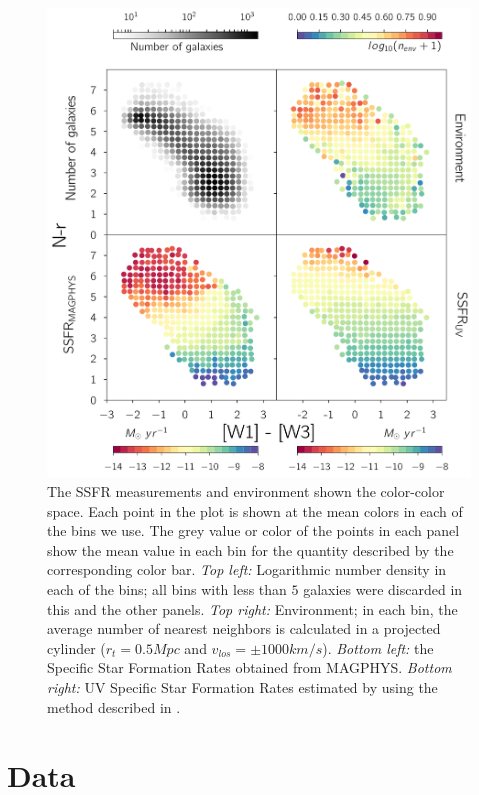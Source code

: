 \documentclass[iop]{emulateapj}
\begin{document}
\begin{figure}
    \centering
	\includegraphics[width = 16 cm, height = 16 cm]{1_panel_plot.pdf}
	\caption{The SSFR measurements and environment shown the color-color 
    space. Each point in the plot is shown at the mean colors in each of 
    the bins we use. The grey value or color of the points in each
    panel show the mean value in each bin for the quantity described 
    by the corresponding  color bar.
    \emph{Top left:} Logarithmic number density in each of the 
    bins; all bins with less than $5$ galaxies were discarded in this 
    and the other panels. \emph{Top right:} Environment; in each bin, 
    the average number of nearest neighbors is calculated in a 
    projected cylinder ($r_{t} = 0.5 Mpc$ and $v_{los} = \pm 1000 km/s$). 
    \emph{Bottom left:} the Specific Star Formation Rates obtained from 
    MAGPHYS. \emph{Bottom right:} UV Specific Star Formation Rates 
    estimated by using the method described in \citet{salim_uv_2007}.} 
\end{figure}

\section{Data}
\end{document}
